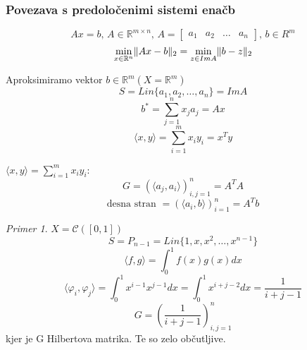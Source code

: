 \documentclass[a4paper,12pt]{article}
\DeclarePairedDelimiter\norm{\lVert}{\rVert}
\newcommand{\innerproduct}[2]{\langle #1, #2 \rangle}
\theoremstyle{definition}
\theoremstyle{remark}
\newtheorem*{ex}{Primer}
\newcommand{\R}{\mathbb{R}}
\begin{document}
\subsubsection{Povezava s predoločenimi sistemi enačb}
\begin{equation*}
    Ax = b \text{, } A\in \R^{m \times n} \text{, } A = 
    \begin{bmatrix}
        a_1 & a_2 & \dots & a_n
    \end{bmatrix} \text{, }  b \in R^m
\end{equation*}
\begin{equation*}
    \min_{x \in \R^n} \norm{Ax - b}_2 = \min_{z \in ImA} \norm{b - z}_2
\end{equation*}

Aproksimiramo vektor $b \in \R^m (X = \R^m)$
\begin{equation*}
    S = Lin\{a_1, a_2, \dots, a_n\} = ImA
\end{equation*}
\begin{equation*}
    b^* = \sum_{j = 1}^{n}x_j a_j = Ax
\end{equation*}
\begin{equation*}
    \innerproduct{x}{y} = \sum_{i = 1}^{m}x_i y_i = x^T y
\end{equation*}

$\innerproduct{x}{y} = \sum_{i = 1}^{m} x_i y_i$:
\begin{equation}
    G = (\innerproduct{a_j}{a_i})_{i, j = 1}^n = A^T A
\end{equation}
\begin{equation}
    \text{desna stran } = (\innerproduct{a_i}{b})_{i = 1}^n = A^Tb
\end{equation}

\begin{ex}
    $X = \mathscr{C} ([0, 1])$
    \begin{equation*}
        S = P_{n-1} = Lin\{1, x, x^2, \dots, x^{n-1}\}
    \end{equation*}
    \begin{equation*}
        \innerproduct{f}{g} = \int_{0}^{1} f(x) g(x) dx
    \end{equation*}
    \begin{equation*}
        \innerproduct{\varphi_i}{\varphi_j} = \int_{0}^{1} x^{i-1} x^{j-1} dx = \int_{0}^{1}x^{i+j-2} dx = \frac{1}{i+j-1}
    \end{equation*}
    \begin{equation*}
        G = (\frac{1}{i+j-1})_{i, j = 1}^n
    \end{equation*}
    kjer je G Hilbertova matrika. Te so zelo občutljive.
\end{ex}
\end{document}

